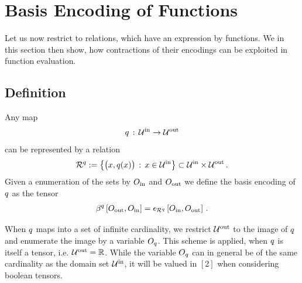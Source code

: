 \section{Basis Encoding of Functions}

Let us now restrict to relations, which have an expression by functions.
We in this section then show, how contractions of their encodings can be exploited in function evaluation.

\subsection{Definition}


\begin{definition}
    \label{def:functionRelationEncoding}
    Any map
    \begin{align*}
        q\,:\, \mathcal{U}^{\mathrm{in}} \rightarrow \mathcal{U}^{\mathrm{out}}
    \end{align*}
    can be represented by a relation
    \begin{align*}
        \mathcal{R}^{q} := \left\{ \big(x,q(x)\big) \,:\, x \in\mathcal{U}^{\mathrm{in}} \right\} \subset \mathcal{U}^{\mathrm{in}} \times \mathcal{U}^{\mathrm{out}} \, .
    \end{align*}
    Given a enumeration of the sets by $O_{\mathrm{in}}$ and $O_{\mathrm{out}}$ we define the basis encoding of $q$ as the tensor
    \begin{align*}
        \bencodingofat{\exfunction}{\indvariableof{\outsymbol},\indvariableof{\insymbol}}
        = \onehotmapofat{\exrelationof{\exfunction}}{\indvariableof{\insymbol},\indvariableof{\outsymbol}}  \, .
    \end{align*}
\end{definition}

\begin{remark}
    When $q$ maps into a set of infinite cardinality, we restrict $\mathcal{U}^{\mathrm{out}}$ to the image of $q$ and enumerate the image by a variable $O_{q}$.
    This scheme is applied, when $q$ is itself a tensor, i.e. $\mathcal{U}^{\mathrm{out}}=\mathbb{R}$.
    While the variable $O_{q}$ can in general be of the same cardinality as the domain set $\mathcal{U}^{\mathrm{in}}$, it will be valued in $[2]$ when considering boolean tensors.
\end{remark}

